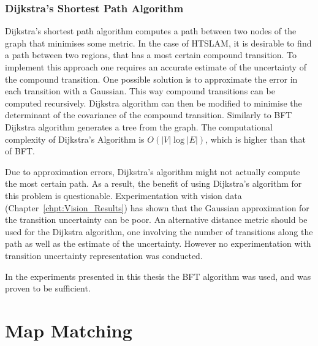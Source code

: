 \subsubsection{Dijkstra's Shortest Path Algorithm}


Dijkstra's shortest path algorithm computes a path between two nodes
of the graph that minimises some metric. In the case of HTSLAM, it is
desirable to find a path between two regions, that has a most certain
compound transition. To implement this approach one requires an
accurate estimate of the uncertainty of the compound transition.  One
possible solution is to approximate the error in each transition with
a Gaussian. This way compound transitions can be computed
recursively. Dijkstra algorithm can then be modified to minimise the
determinant of the covariance of the compound transition. Similarly to
BFT Dijkstra algorithm generates a tree from the graph. The
computational complexity of Dijkstra's Algorithm is $O(|V| \log |E|)$,
which is higher than that of BFT.

Due to approximation errors, Dijkstra's algorithm might not actually
compute the most certain path. As a result, the benefit of using
Dijkstra's algorithm for this problem is questionable. Experimentation
with vision data (Chapter~\ref{chpt:Vision_Results}) has shown that the
Gaussian approximation for the transition uncertainty can be poor.  An
alternative distance metric should be used for the Dijkstra algorithm,
one involving the number of transitions along the path as well as the
estimate of the uncertainty. However no experimentation with transition
uncertainty representation was conducted.

In the experiments presented in this thesis the BFT algorithm was
used, and was proven to be sufficient.


\section{Map Matching}
\label{sec:map_matching}


